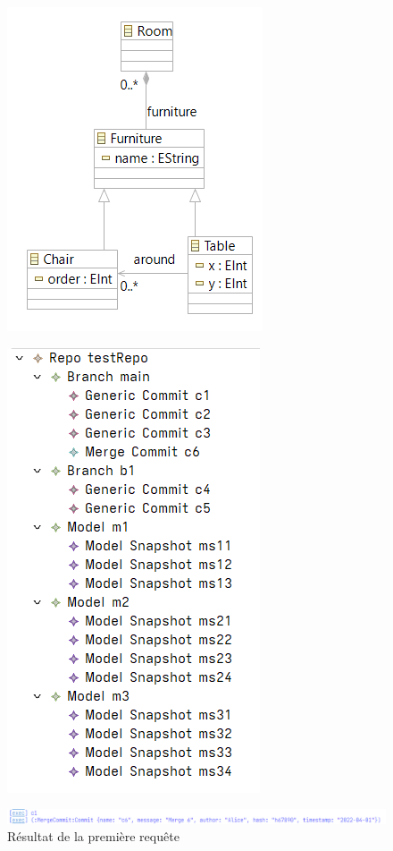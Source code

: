 \documentclass[12pt, titlepage]{article}
\begin{document}
\begin{figure}[ht]
  \centering
  \begin{minipage}{0.5\textwidth}
    \centering
    \includegraphics[width=0.4\linewidth]{drmm.png}
    \label{fig:drmm}
  \end{minipage}%
  \begin{minipage}{0.5\textwidth}
    \centering
    \includegraphics[width=0.4\linewidth]{repom.png}
    \label{fig:repom}
  \end{minipage}
\end{figure}

\begin{figure}[ht!]
  \includegraphics[width=\textwidth]{res1.png}
  \caption{Résultat de la première requête}
  \label{fig:res1}
\end{figure}
\end{document}
